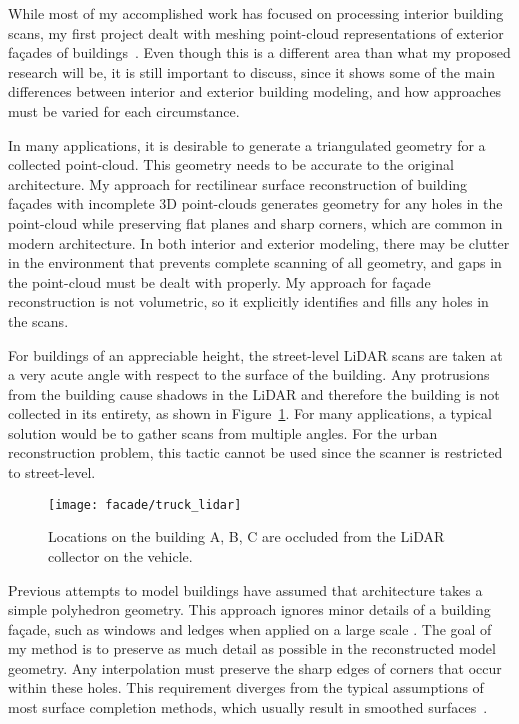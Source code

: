 \documentclass[journal]{IEEEtran}
\begin{document}
While most of my accomplished work has focused on processing interior building scans, my first project dealt with meshing point-cloud representations of exterior fa\c{c}ades of buildings~\cite{TurnerICIP12}.  Even though this is a different area than what my proposed research will be, it is still important to discuss, since it shows some of the main differences between interior and exterior building modeling, and how approaches must be varied for each circumstance.

In many applications, it is desirable to generate a triangulated geometry for a collected point-cloud.  This geometry needs to be accurate to the original architecture.  My approach for rectilinear surface reconstruction of building fa\c{c}ades with incomplete 3D point-clouds generates geometry for any holes in the point-cloud while preserving flat planes and sharp corners, which are common in modern architecture.  In both interior and exterior modeling, there may be clutter in the environment that prevents complete scanning of all geometry, and gaps in the point-cloud must be dealt with properly.  My approach for fa\c{c}ade reconstruction is not volumetric, so it explicitly identifies and fills any holes in the scans.

For buildings of an appreciable height, the street-level LiDAR scans are taken at a very acute angle with respect to the surface of the building.  Any protrusions from the building cause shadows in the LiDAR and therefore the building is not collected in its entirety, as shown in Figure~\ref{fig:truck_lidar}.  For many applications, a typical solution would be to gather scans from multiple angles.  For the urban reconstruction problem, this tactic cannot be used since the scanner is restricted to street-level.

\begin{figure}[t]

\begin{minipage}[b]{1.0\linewidth}
  \centering
  \centerline{\texttt{[image: facade/truck\_lidar]}}
\end{minipage}

\caption{Locations on the building A, B, C are occluded from the LiDAR collector on the vehicle.}
\label{fig:truck_lidar}

\end{figure}

Previous attempts to model buildings have assumed that architecture takes a simple polyhedron geometry. This approach ignores minor details of a building fa\c{c}ade, such as windows and ledges when applied on a large scale \cite{Chen07}.  The goal of my method is to preserve as much detail as possible in the reconstructed model geometry.  Any interpolation must preserve the sharp edges of corners that occur within these holes.  This requirement diverges from the typical assumptions of most surface completion methods, which usually result in smoothed surfaces~\cite{Poisson}.
\end{document}

